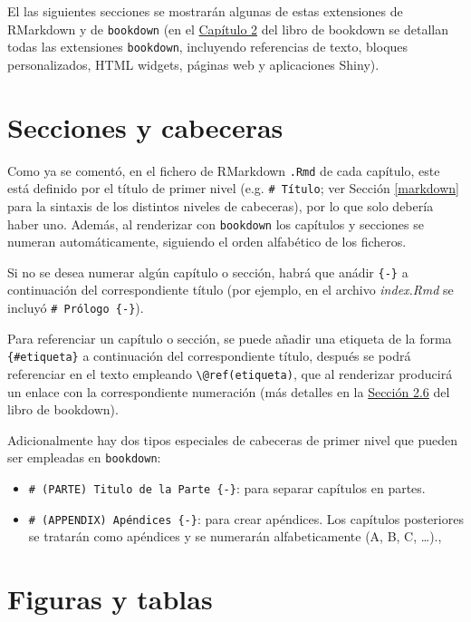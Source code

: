 \documentclass[]{book}
\theoremstyle{definition}
\theoremstyle{definition}
\theoremstyle{definition}
\theoremstyle{remark}
\begin{document}
El las siguientes secciones se mostrarán algunas de estas extensiones de
RMarkdown y de \texttt{bookdown} (en el
\href{https://bookdown.org/yihui/bookdown/markdown-extensions-by-bookdown.html}{Capítulo
2} del libro de bookdown se detallan todas las extensiones
\texttt{bookdown}, incluyendo referencias de texto, bloques
personalizados, HTML widgets, páginas web y aplicaciones Shiny).

\section{Secciones y cabeceras}\label{secciones-y-cabeceras}

Como ya se comentó, en el fichero de RMarkdown \texttt{.Rmd} de cada
capítulo, este está definido por el título de primer nivel (e.g.
\texttt{\#\ Título}; ver Sección \ref{markdown} para la sintaxis de los
distintos niveles de cabeceras), por lo que solo debería haber uno.
Además, al renderizar con \texttt{bookdown} los capítulos y secciones se
numeran automáticamente, siguiendo el orden alfabético de los ficheros.

Si no se desea numerar algún capítulo o sección, habrá que anádir
\texttt{\{-\}} a continuación del correspondiente título (por ejemplo,
en el archivo \emph{index.Rmd} se incluyó \texttt{\#\ Prólogo\ \{-\}}).

Para referenciar un capítulo o sección, se puede añadir una etiqueta de
la forma \texttt{\{\#etiqueta\}} a continuación del correspondiente
título, después se podrá referenciar en el texto empleando
\texttt{\textbackslash{}@ref(etiqueta)}, que al renderizar producirá un
enlace con la correspondiente numeración (más detalles en la
\href{https://bookdown.org/yihui/bookdown/cross-references.html}{Sección
2.6} del libro de bookdown).

Adicionalmente hay dos tipos especiales de cabeceras de primer nivel que
pueden ser empleadas en \texttt{bookdown}:

\begin{itemize}
\item
  \texttt{\#\ (PARTE)\ Titulo\ de\ la\ Parte\ \{-\}}: para separar
  capítulos en partes.
\item
  \texttt{\#\ (APPENDIX)\ Apéndices\ \{-\}}: para crear apéndices. Los
  capítulos posteriores se tratarán como apéndices y se numerarán
  alfabeticamente (A, B, C, \ldots{}).,
\end{itemize}

\section{Figuras y tablas}\label{figuras-y-tablas}
\end{document}
